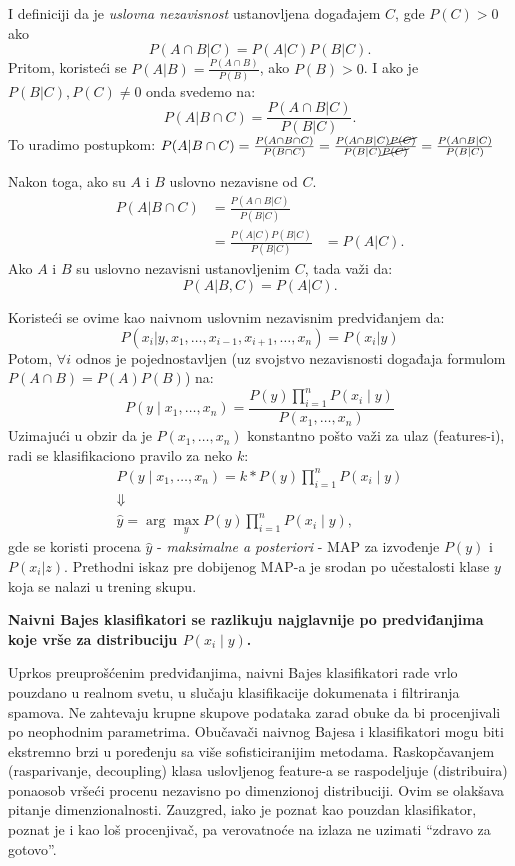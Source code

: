 \documentclass[fontsize=12bp, paper=a4]{scrarticle}
\begin{document}
I definiciji da je \textit{uslovna nezavisnost} ustanovljena događajem $C$, gde $P(C) > 0$ ako 
$$P(A \cap B|C)=P(A|C)P(B|C).$$
Pritom, koristeći se $P(A|B)=\frac{P(A \cap B)}{P(B)}$, ako $P(B) > 0$. I ako je $P(B|C), P(C)\ne 0$ onda svedemo na:
$$P(A|B\cap C)=\frac{P(A \cap B|C)}{P(B|C)}.$$
To uradimo postupkom: $P(A|B\cap C)= \frac{P(A\cap B\cap C)}{P(B\cap C)} = \frac{P(A \cap B|C)\cancel{P(C)}}{P(B|C)\cancel{P(C)}} =\frac{P(A \cap B|C)}{P(B|C)}$

\newpage

Nakon toga, ako su $A$ i $B$ uslovno nezavisne od $C$.
$$\begin{aligned}
    P(A|B\cap C) &=\frac{P(A \cap B|C)}{P(B|C)} \\
    &=\frac{P(A|C)P(B|C)}{P(B|C)}
    &=P(A|C).
\end{aligned}
$$
Ako $A$ i $B$ su uslovno nezavisni ustanovljenim $C$, tada važi da:
$$P(A | B,C)=P(A|C).$$

Koristeći se ovime kao naivnom uslovnim nezavisnim predviđanjem da:
$$P(x_i | y, x_1, \dots, x_{i-1}, x_{i+1}, \dots, x_n) = P(x_i | y)$$
Potom, $\forall i$ odnos je pojednostavljen (uz svojstvo nezavisnosti događaja formulom $P(A \cap B)=P(A)P(B)$) na:
$$P(y \mid x_1, \dots, x_n) = \frac{P(y) \prod_{i=1}^{n} P(x_i \mid y)}
{P(x_1, \dots, x_n)}$$
Uzimajući u obzir da je $P(x_1, \dots, x_n)$ konstantno pošto važi za ulaz (features-i), radi se klasifikaciono pravilo za neko $k$:
$$\begin{aligned}P(y \mid x_1, \dots, x_n) = k* P(y) \prod_{i=1}^{n} P(x_i \mid y)\\\Downarrow\\\hat{y} = \arg\max_y P(y) \prod_{i=1}^{n} P(x_i \mid y),\end{aligned}$$
gde se koristi procena $\hat{y}$ - \textit{maksimalne a posteriori} - MAP za izvođenje $P(y)$ i $P(x_i|z)$. Prethodni iskaz pre dobijenog MAP-a je srodan po učestalosti klase $y$  koja se nalazi u trening skupu.

\vbox{}
\textbf{Naivni Bajes klasifikatori se razlikuju najglavnije po predviđanjima koje vrše za distribuciju $P(x_i \mid y)$.}

Uprkos preuprošćenim predviđanjima, naivni Bajes klasifikatori rade vrlo pouzdano u realnom svetu, u slučaju klasifikacije dokumenata i filtriranja spamova. Ne zahtevaju krupne skupove podataka zarad obuke da bi procenjivali po neophodnim parametrima. Obučavači naivnog Bajesa i klasifikatori mogu biti ekstremno brzi u poređenju sa više sofisticiranijim metodama. Raskopčavanjem (rasparivanje, decoupling) klasa uslovljenog feature-a se raspodeljuje (distribuira) ponaosob vršeći procenu nezavisno po dimenzionoj distribuciji. Ovim se olakšava pitanje dimenzionalnosti. Zauzgred, iako je poznat kao pouzdan klasifikator, poznat je i kao loš procenjivač, pa verovatnoće na izlaza ne uzimati ``zdravo za gotovo''.
\end{document}
